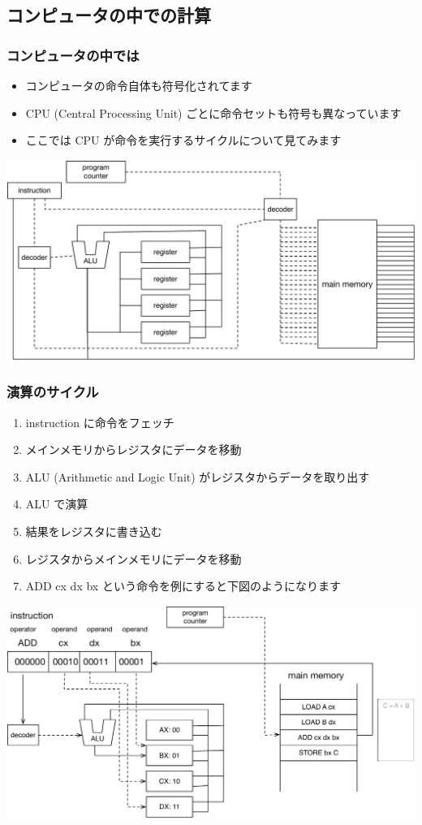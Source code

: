 \subsection{コンピュータの中での計算}
\begin{frame}[shrink]
\frametitle{コンピュータの中では}
  \begin{itemize}
\item コンピュータの命令自体も符号化されてます
\item CPU (Central Processing Unit) ごとに命令セットも符号も異なっています
\item ここでは CPU が命令を実行するサイクルについて見てみます
  \end{itemize}
  \begin{center}
\includegraphics[scale=0.3]{./Figure/elementaryCS-figCPU}
  \end{center}
\end{frame}
\begin{frame}[shrink]
\frametitle{演算のサイクル}
  \begin{enumerate}
\scriptsize
\item instruction に命令をフェッチ
\item メインメモリからレジスタにデータを移動
\item ALU (Arithmetic and Logic Unit) がレジスタからデータを取り出す
\item ALU で演算
\item 結果をレジスタに書き込む
\item レジスタからメインメモリにデータを移動
\item ADD cx dx bx という命令を例にすると下図のようになります
  \end{enumerate}
  \begin{center}
\includegraphics[scale=0.3]{./Figure/elementaryCS-figCycle}
  \end{center}
\end{frame}
